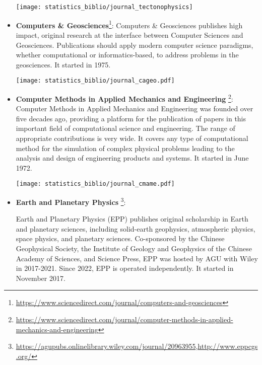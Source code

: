 \begin{itemize}
\begin{center}
\texttt{[image: statistics\_biblio/journal\_tectonophysics]}
\end{center}

\item {\bf Computers \& Geosciences}\footnote{\url{https://www.sciencedirect.com/journal/computers-and-geosciences}}:
Computers \& Geosciences publishes high impact, original research at the interface between 
Computer Sciences and Geosciences. Publications should apply modern computer science paradigms, 
whether computational or informatics-based, to address problems in the geosciences.
It started in 1975.

\begin{center}
\texttt{[image: statistics\_biblio/journal\_cageo.pdf]}
\end{center}

\item {\bf Computer Methods in Applied Mechanics and Engineering}
\footnote{\url{https://www.sciencedirect.com/journal/computer-methods-in-applied-mechanics-and-engineering}}:
Computer Methods in Applied Mechanics and Engineering was founded over five decades ago, 
providing a platform for the publication of papers in this important field of computational science 
and engineering. The range of appropriate contributions is very wide. It covers any type of 
computational method for the simulation of complex physical problems leading to the analysis and design 
of engineering products and systems.
It started in June 1972.
 
\begin{center}
\texttt{[image: statistics\_biblio/journal\_cmame.pdf]}
\end{center}

\item {\bf Earth and Planetary Physics}
\footnote{\url{https://agupubs.onlinelibrary.wiley.com/journal/20963955},\url{http://www.eppcgs.org/}}:

Earth and Planetary Physics (EPP) publishes original scholarship in Earth and planetary sciences, 
including solid-earth geophysics, atmospheric physics, space physics, and planetary sciences. 
Co-sponsored by the Chinese Geophysical Society, the Institute of Geology and Geophysics of the Chinese 
Academy of Sciences, and Science Press, EPP was hosted by AGU with Wiley in 2017-2021. 
Since 2022, EPP is operated independently.
It started in November 2017.


\end{itemize}

